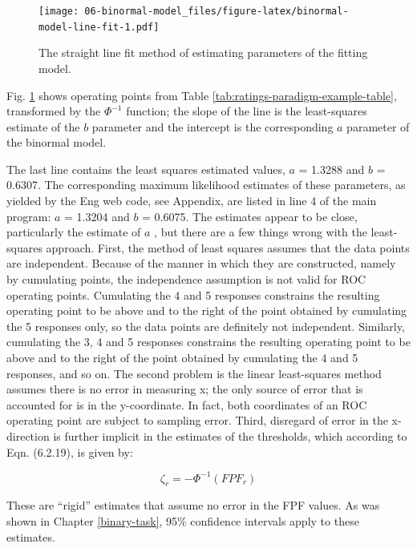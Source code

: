 \documentclass[
]{book}
\begin{document}
\begin{figure}
\centering
\texttt{[image: 06-binormal-model\_files/figure-latex/binormal-model-line-fit-1.pdf]}
\caption{\label{fig:binormal-model-line-fit}The straight line fit method of estimating parameters of the fitting model.}
\end{figure}

Fig. \ref{fig:binormal-model-line-fit} shows operating points from Table \ref{tab:ratings-paradigm-example-table}, transformed by the \(\Phi^{-1}\) function; the slope of the line is the least-squares estimate of the \(b\) parameter and the intercept is the corresponding \(a\) parameter of the binormal model.

The last line contains the least squares estimated values, \(a\) = 1.3288 and \(b\) = 0.6307. The corresponding maximum likelihood estimates of these parameters, as yielded by the Eng web code, see Appendix, are listed in line 4 of the main program: \(a\) = 1.3204 and \(b\) = 0.6075. The estimates appear to be close, particularly the estimate of \(a\) , but there are a few things wrong with the least-squares approach. First, the method of least squares assumes that the data points are independent. Because of the manner in which they are constructed, namely by cumulating points, the independence assumption is not valid for ROC operating points. Cumulating the 4 and 5 responses constrains the resulting operating point to be above and to the right of the point obtained by cumulating the 5 responses only, so the data points are definitely not independent. Similarly, cumulating the 3, 4 and 5 responses constrains the resulting operating point to be above and to the right of the point obtained by cumulating the 4 and 5 responses, and so on. The second problem is the linear least-squares method assumes there is no error in measuring x; the only source of error that is accounted for is in the y-coordinate. In fact, both coordinates of an ROC operating point are subject to sampling error. Third, disregard of error in the x-direction is further implicit in the estimates of the thresholds, which according to Eqn. (6.2.19), is given by:

\begin{equation*} 
\zeta_r = - \Phi^{-1}\left ( FPF_r \right )
\end{equation*}

These are ``rigid'' estimates that assume no error in the FPF values. As was shown in Chapter \ref{binary-task}, 95\% confidence intervals apply to these estimates.
\end{document}
